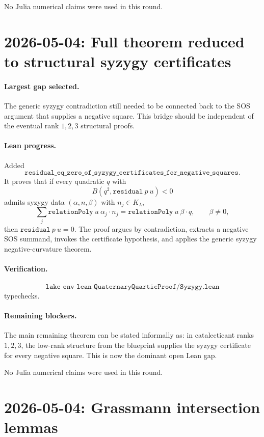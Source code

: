 \documentclass[11pt]{article}
\begin{document}
No Julia numerical claims were used in this round.

\section*{2026-05-04: Full theorem reduced to structural syzygy certificates}

\paragraph{Largest gap selected.}
The generic syzygy contradiction still needed to be connected back to the SOS
argument that supplies a negative square.  This bridge should be independent
of the eventual rank \(1,2,3\) structural proofs.

\paragraph{Lean progress.}
Added
\[
\texttt{residual\_eq\_zero\_of\_syzygy\_certificates\_for\_negative\_squares}.
\]
It proves that if every quadratic \(q\) with
\[
B(q^2,\texttt{residual}\ p\ u)<0
\]
admits syzygy data \((\alpha,n,\beta)\) with \(n_j\in K_\lambda\),
\[
\sum_j \texttt{relationPoly}\ u\ \alpha_j\cdot n_j
=\texttt{relationPoly}\ u\ \beta\cdot q,
\qquad \beta\ne0,
\]
then \(\texttt{residual}\ p\ u=0\).  The proof argues by contradiction,
extracts a negative SOS summand, invokes the certificate hypothesis, and
applies the generic syzygy negative-curvature theorem.

\paragraph{Verification.}
\[
\texttt{lake env lean QuaternaryQuarticProof/Syzygy.lean}
\]
typechecks.

\paragraph{Remaining blockers.}
The main remaining theorem can be stated informally as: in catalecticant ranks
\(1,2,3\), the low-rank structure from the blueprint supplies the syzygy
certificate for every negative square.  This is now the dominant open Lean
gap.

No Julia numerical claims were used in this round.

\section*{2026-05-04: Grassmann intersection lemmas}
\end{document}
